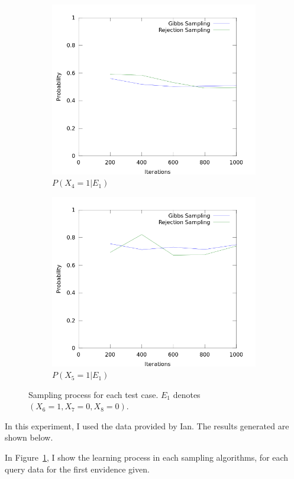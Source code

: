 \documentclass[11pt]{article}
\begin{document}
\begin{figure}
\begin{subfigure}[b]{0.49\textwidth}
	\includegraphics[width=\textwidth]{ian5.png}
	\caption{$P(X_4=1 | E_1) $}
\end{subfigure}
\begin{subfigure}[b]{0.49\textwidth}
	\includegraphics[width=\textwidth]{ian6.png}
	\caption{$P(X_5=1 | E_1) $}
\end{subfigure}
\caption{Sampling process for each test case. $E_1$ denotes $(X_6 = 1,
X_7 = 0, X_8 = 0)$.}
\label{fig:lp}
\end{figure}

In this experiment, I used the data provided by Ian. The results
generated are shown below.

In Figure~\ref{fig:lp}, I show the learning process in each sampling
algorithms, for each query data for the first envidence given.
\end{document}
